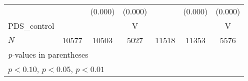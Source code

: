 \documentclass[11pt, letterpaper]{article}
\begin{document}
{\begin{tabular}{l*{6}{c}}
            &                     &     (0.000)         &     (0.000)         &                     &     (0.000)         &     (0.000)         \\
[1em]
PDS\_control  &                     &                    &      V             &                   &                 &      V \\
\hline
\(N\)       &       10577         &       10503         &        5027         &       11518         &       11353         &        5576         \\
\hline\hline
\multicolumn{7}{l}{\footnotesize \textit{p}-values in parentheses}\\
\multicolumn{7}{l}{\footnotesize \sym{*} \(p<0.10\), \sym{**} \(p<0.05\), \sym{***} \(p<0.01\)}\\
\end{tabular}
}
\end{document}
